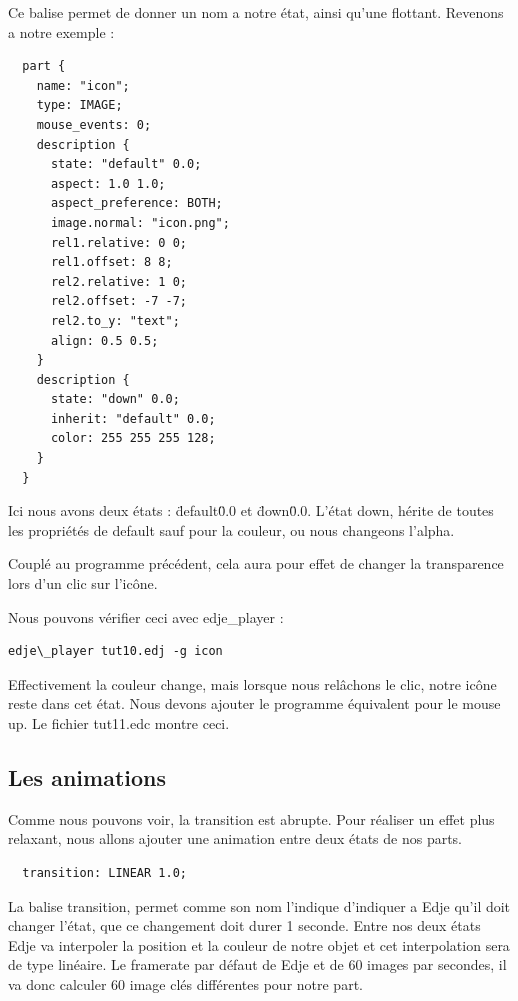 \documentclass[a4paper]{efr}
\begin{document}
Ce balise permet de donner un nom a notre état, ainsi qu'une flottant.
Revenons a notre exemple :

\begin{lstlisting}
  part {
    name: "icon";
    type: IMAGE;
    mouse_events: 0;
    description {
      state: "default" 0.0;
      aspect: 1.0 1.0;
      aspect_preference: BOTH;
      image.normal: "icon.png";
      rel1.relative: 0 0;
      rel1.offset: 8 8;
      rel2.relative: 1 0;
      rel2.offset: -7 -7;
      rel2.to_y: "text";
      align: 0.5 0.5;
    }
    description {
      state: "down" 0.0;
      inherit: "default" 0.0;
      color: 255 255 255 128;
    }
  }
\end{lstlisting}

Ici nous avons deux états : \"default\" 0.0 et \"down\" 0.0.
L'état down, hérite de toutes les propriétés de default sauf pour la couleur, ou
nous changeons l'alpha.

Couplé au programme précédent, cela aura pour effet de changer la transparence
lors d'un clic sur l'icône.

Nous pouvons vérifier ceci avec edje\_player :
\begin{lstlisting}
edje\_player tut10.edj -g icon
\end{lstlisting}

Effectivement la couleur change, mais lorsque nous relâchons le clic, notre
icône reste dans cet état. Nous devons ajouter le programme équivalent pour le
mouse up. Le fichier tut11.edc montre ceci.

\subsection{Les animations}

Comme nous pouvons voir, la transition est abrupte. Pour réaliser un effet plus
relaxant, nous allons ajouter une animation entre deux états de nos parts.

\begin{lstlisting}
  transition: LINEAR 1.0;
\end{lstlisting}

La balise transition, permet comme son nom l'indique d'indiquer a Edje qu'il
doit changer l'état, que ce changement doit durer 1 seconde.
Entre nos deux états Edje va interpoler la position et la couleur de notre
objet et cet interpolation sera de type linéaire. Le framerate par défaut de
Edje et de 60 images par secondes, il va donc calculer 60 image clés différentes
pour notre part.
\end{document}
